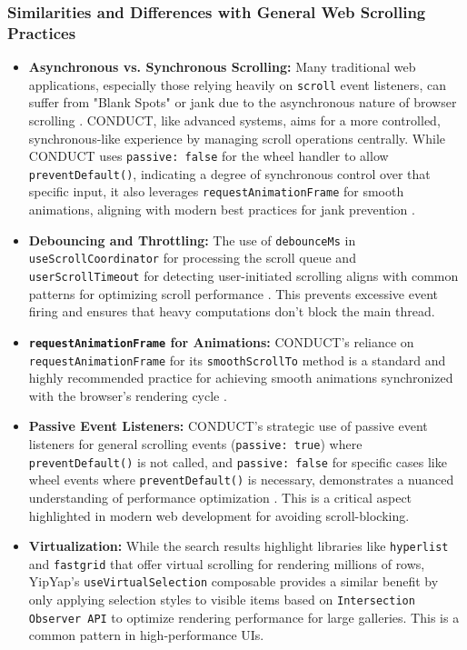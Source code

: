 \documentclass[10pt]{article}
\begin{document}
\subsubsection{Similarities and Differences with General Web Scrolling Practices}
\begin{itemize}
    \item \textbf{Asynchronous vs. Synchronous Scrolling:} Many traditional web applications, especially those relying heavily on \texttt{scroll} event listeners, can suffer from "Blank Spots" or jank due to the asynchronous nature of browser scrolling \cite{monday}. CONDUCT, like advanced systems, aims for a more controlled, synchronous-like experience by managing scroll operations centrally. While CONDUCT uses \texttt{passive: false} for the wheel handler to allow \texttt{preventDefault()}, indicating a degree of synchronous control over that specific input, it also leverages \texttt{requestAnimationFrame} for smooth animations, aligning with modern best practices for jank prevention \cite{chrome, joji}.
    \item \textbf{Debouncing and Throttling:} The use of \texttt{debounceMs} in \texttt{useScrollCoordinator} for processing the scroll queue and \texttt{userScrollTimeout} for detecting user-initiated scrolling aligns with common patterns for optimizing scroll performance \cite{qbit, joji}. This prevents excessive event firing and ensures that heavy computations don't block the main thread.
    \item \textbf{\texttt{requestAnimationFrame} for Animations:} CONDUCT's reliance on \texttt{requestAnimationFrame} for its \texttt{smoothScrollTo} method is a standard and highly recommended practice for achieving smooth animations synchronized with the browser's rendering cycle \cite{joji}.
    \item \textbf{Passive Event Listeners:} CONDUCT's strategic use of passive event listeners for general scrolling events (\texttt{passive: true}) where \texttt{preventDefault()} is not called, and \texttt{passive: false} for specific cases like wheel events where \texttt{preventDefault()} is necessary, demonstrates a nuanced understanding of performance optimization \cite{monday, msedge}. This is a critical aspect highlighted in modern web development for avoiding scroll-blocking.
    \item \textbf{Virtualization:} While the search results highlight libraries like \texttt{hyperlist} \cite{hyperlist} and \texttt{fastgrid} \cite{fastgrid} that offer virtual scrolling for rendering millions of rows, YipYap's \texttt{useVirtualSelection} composable provides a similar benefit by only applying selection styles to visible items based on \texttt{Intersection Observer API} to optimize rendering performance for large galleries. This is a common pattern in high-performance UIs.
\end{itemize}
\end{document}
